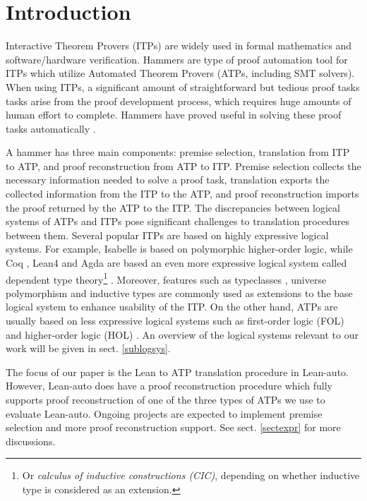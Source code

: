 \section{Introduction}

  Interactive Theorem Provers (ITPs) \cite{Harrison2014HistoryOI}
  are widely used in formal mathematics and software/hardware verification. Hammers
  \cite{Blanchette2016HammeringTQ}\cite{Czajka2018HammerFC} are type of proof automation tool for
  ITPs which utilize Automated Theorem Provers (ATPs, including SMT solvers).
  When using ITPs, a significant amount of straightforward but tedious proof tasks
  tasks arise from the proof development process, which requires huge amounts of human
  effort to complete. Hammers have proved useful in solving these proof tasks automatically \cite{Paulson2012ThreeYO}.
  
  A hammer has three main components: premise selection, translation from ITP to
  ATP, and proof reconstruction from ATP to ITP. Premise selection collects
  the necessary information needed to solve a proof task, translation exports
  the collected information from the ITP to the ATP, and proof reconstruction imports the
  proof returned by the ATP to the ITP. The discrepancies between logical systems of ATPs and ITPs pose
  significant challenges to translation procedures between them.
  Several popular ITPs are based on highly expressive logical systems.
  For example, Isabelle \cite{Isabelle} is based on polymorphic higher-order logic, while
  Coq \cite{CoqRefMan}, Lean4 \cite{Lean4} and Agda \cite{Agda}
  are based an even more expressive logical system called dependent type
  theory\footnote{Or \textit{calculus of inductive constructions (CIC)}, depending
  on whether inductive type is considered as an extension.}
  \cite{LambdaWithType}\cite{Coquand1988}.
  Moreover, features such as typeclasses \cite{TypeClassHaskell}, universe polymorphism \cite{UPolyCoq} and inductive types \cite{CICIndDef}
  are commonly used as extensions to the base logical system to enhance usability of the ITP.
  On the other hand, ATPs are usually based on less expressive logical systems such
  as first-order logic (FOL) \cite{CVC5}\cite{Vampire}\cite{Z3Paper}\cite{EProver} and
  higher-order logic (HOL) \cite{HOVampire}\cite{ZipperpositionMakeWork}\cite{HOEProver}.
  An overview of the logical systems relevant to our work will be given in sect. \ref{sublogsys}.

  The focus of our paper is the Lean to ATP translation procedure in Lean-auto.
  However, Lean-auto does have a proof reconstruction procedure which fully supports proof
  reconstruction of one of the three types of ATPs we use to evaluate Lean-auto.
  Ongoing projects are expected to implement premise selection and more proof reconstruction support.
  See sect. \ref{sectexpr} for more discussions.

